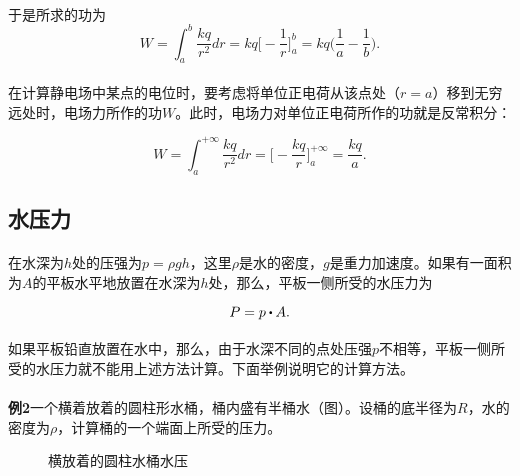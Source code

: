 \paragraph{}
于是所求的功为
\begin{equation}
  W = \int_a^b\frac{kq}{r^2}dr = kq\big[ -\frac{1}{r} \big]_a^b = kq\big( \frac{1}{a} - \frac{1}{b} \big).
\end{equation}

\paragraph{}
在计算静电场中某点的电位时，要考虑将单位正电荷从该点处（$r=a$）移到无穷远处时，电场力所作的功$W$。此时，电场力对单位正电荷所作的功就是反常积分：

\begin{equation}
  W = \int_a^{+\infty}\frac{kq}{r^2}dr = \big[ -\frac{kq}{r} \big]_a^{+\infty} = \frac{kq}{a}.
\end{equation}

\subsection{水压力}
\paragraph{}
在水深为$h$处的压强为$p = \rho gh$，这里$\rho$是水的密度，$g$是重力加速度。如果有一面积为$A$的平板水平地放置在水深为$h$处，那么，平板一侧所受的水压力为

\begin{equation}
  P = p \bigcdot A.
\end{equation}

\paragraph{}
如果平板铅直放置在水中，那么，由于水深不同的点处压强$p$不相等，平板一侧所受的水压力就不能用上述方法计算。下面举例说明它的计算方法。

\paragraph{}
\textbf{例2\;}一个横着放着的圆柱形水桶，桶内盛有半桶水（图）。设桶的底半径为$R$，水的密度为$\rho$，计算桶的一个端面上所受的压力。

\begin{figure}[H]
\centering
  \begin{subfigure}[t]{0.42\linewidth}
    \centering
      
      \caption{}
      \label{横放着的圆柱水桶水压a}
  \end{subfigure}
  \begin{subfigure}[t]{0.42\linewidth}
    \centering
      
      \caption{}
      \label{横放着的圆柱水桶水压b}
  \end{subfigure}

  \caption{横放着的圆柱水桶水压}
  \label{横放着的圆柱水桶水压}
\end{figure}

